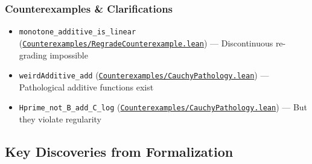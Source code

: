 \documentclass[11pt]{article}
\theoremstyle{definition}
\theoremstyle{remark}
\begin{document}
\subsubsection*{Counterexamples \& Clarifications}
\begin{itemize}
\item \texttt{monotone\_additive\_is\_linear} (\href{https://github.com/zariuq/ks-foundations-of-inference/blob/main/KnuthSkilling/Counterexamples/RegradeCounterexample.lean}{\texttt{Counterexamples/RegradeCounterexample.lean}}) --- Discontinuous re-grading impossible
\item \texttt{weirdAdditive\_add} (\href{https://github.com/zariuq/ks-foundations-of-inference/blob/main/KnuthSkilling/Counterexamples/CauchyPathology.lean}{\texttt{Counterexamples/CauchyPathology.lean}}) --- Pathological additive functions exist
\item \texttt{Hprime\_not\_B\_add\_C\_log} (\href{https://github.com/zariuq/ks-foundations-of-inference/blob/main/KnuthSkilling/Counterexamples/CauchyPathology.lean}{\texttt{Counterexamples/CauchyPathology.lean}}) --- But they violate regularity
\end{itemize}

\subsection{Key Discoveries from Formalization}
\end{document}
